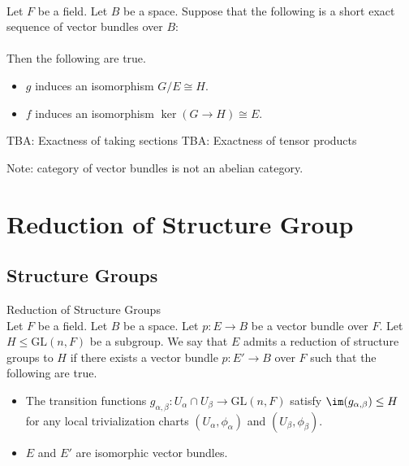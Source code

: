 \documentclass[a4paper]{article}
\begin{document}
\begin{lmm}{}{}\\
Let $F$ be a field. Let $B$ be a space. Suppose that the following is a short exact sequence of vector bundles over $B$: \\
\\
Then the following are true. 
\begin{itemize}
\item $g$ induces an isomorphism $G/E\cong H$. 
\item $f$ induces an isomorphism $\ker(G\to H)\cong E$. 
\end{itemize}
\end{lmm}

TBA: Exactness of taking sections
TBA: Exactness of tensor products

Note: category of vector bundles is not an abelian category. 

\pagebreak
\section{Reduction of Structure Group}
\subsection{Structure Groups}
\begin{defn}{Reduction of Structure Groups}{}\\
Let $F$ be a field. Let $B$ be a space. Let $p:E\to B$ be a vector bundle over $F$. Let $H\leq\text{GL}(n,F)$ be a subgroup. We say that $E$ admits a reduction of structure groups to $H$ if there exists a vector bundle $p:E'\to B$ over $F$ such that the following are true. 
\begin{itemize}
\item The transition functions $g_{\alpha,\beta}:U_\alpha\cap U_\beta\to\text{GL}(n,F)$ satisfy $\im(g_{\alpha,\beta})\leq H$ for any local trivialization charts $(U_\alpha,\phi_\alpha)$ and $(U_\beta,\phi_\beta)$. 
\item $E$ and $E'$ are isomorphic vector bundles. 
\end{itemize}
\end{defn}
\end{document}
